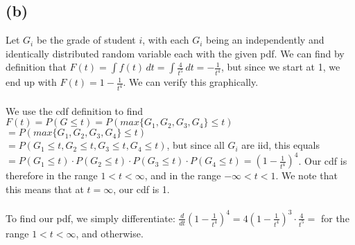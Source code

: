\documentclass{article}
\begin{document}
{\subsection*{(b)}
Let $G_i$ be the grade of student $i$, with each $G_i$ being an independently and identically distributed random variable each with the given pdf. We can find by definition that $F(t) = \int f(t) \, dt = \int \frac{4}{t^5} \, dt = -\frac{1}{t^4}$, but since we start at 1, we end up with $F(t) = 1 - \frac{1}{t^4}$. We can verify this graphically. \\ \\
We use the cdf definition to find $F(t) = P(G \leq t) = P(max\{G_1, G_2, G_3, G_4\} \leq t) $ \\ 
$ = P(max\{G_1, G_2, G_3, G_4\} \leq t)$ \\
$= P(G_1 \leq t, G_2 \leq t, G_3 \leq t, G_4 \leq t)$, but since all $G_i$ are iid, this equals \\
$= P(G_1 \leq t) \cdot P(G_2 \leq t) \cdot P(G_3 \leq t) \cdot P(G_4 \leq t) = (1-\frac{1}{t^4})^4$. Our cdf is therefore  in the range $1 < t < \infty$, and  in the range $-\infty < t < 1$. We note that this means that at $t = \infty$, our cdf is 1. \\ \\
To find our pdf, we simply differentiate: $\frac{d}{dt} (1-\frac{1}{t^4})^4 = 4(1 - \frac{1}{t^4})^3 \cdot \frac{4}{t^5} = $   for the range $1 < t < \infty$, and  otherwise. \\ 

}
\end{document}
